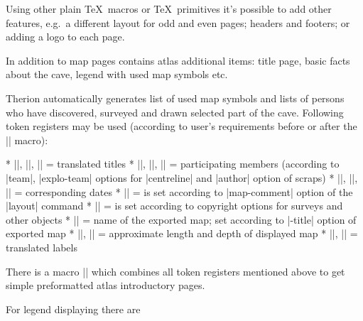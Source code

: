 Using other plain \TeX\ macros or \TeX\ primitives it's possible to add other 
features, e.g.~a different layout for odd and even pages; headers and footers;
or adding a logo to each page. 

In addition to map pages contains atlas additional items: title page, basic 
facts about the cave, legend with used map symbols etc.

Therion automatically generates list of used map symbols and lists of persons
who have discovered, surveyed and drawn selected part of the cave. 
Following token registers may be used (according to user's requirements 
before or after the |\insertmaps| macro):

\list
* |\explotitle|, |\topotitle|, |\cartotitle| = translated titles
* |\exploteam|, |\topoteam|, |\cartoteam| = participating members 
  (according to |team|, |explo-team| options for |centreline| and |author|
  option of scraps)
* |\explodate|, |\topodate|, |\cartodate| = corresponding dates 
* |\comment| = is set according to |map-comment| option of the |layout|
  command
* |\copyrights| = is set according to copyright options for surveys and other
  objects
* |\cavename| = name of the exported map; set according to |-title| option
  of exported map
* |\cavelength|, |\cavedepth| = approximate length and depth of displayed map
* |\cavelengthtitle|, |\cavedepthtitle| = translated labels
\endlist

There is a macro |\atlastitlepages| which combines all token registers 
mentioned above to get simple preformatted atlas introductory pages.

For legend displaying there are

